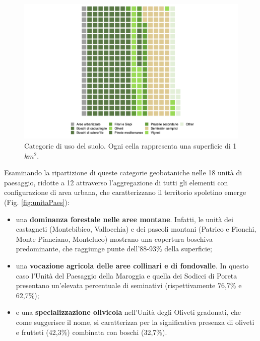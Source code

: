 \documentclass[
]{book}
\begin{document}
\begin{figure}
\includegraphics[width=22.22in]{./figs/RECSpoleto_usoSuoloPlot} \caption{Categorie di uso del suolo. Ogni cella rappresenta una superficie di 1 $km^2$.}\label{fig:usoSuolo}
\end{figure}

Esaminando la ripartizione di queste categorie geobotaniche nelle 18 unità di paesaggio, ridotte a 12 attraverso l'aggregazione di tutti gli elementi con configurazione di area urbana, che caratterizzano il territorio spoletino emerge (Fig. \ref{fig:unitaPaes}):

\begin{itemize}
\item
  una \textbf{dominanza forestale nelle aree montane}.
  Infatti, le unità dei castagneti (Montebibico, Vallocchia) e dei pascoli montani (Patrico e Fionchi, Monte Pianciano, Monteluco) mostrano una copertura boschiva predominante, che raggiunge punte dell'88-93\% della superficie;
\item
  una \textbf{vocazione agricola delle aree collinari e di fondovalle}.
  In questo caso l'Unità del Paesaggio della Maroggia e quella dei Sodicci di Poreta presentano un'elevata percentuale di seminativi (rispettivamente 76,7\% e 62,7\%);
\item
  e una \textbf{specializzazione olivicola} nell'Unità degli Oliveti gradonati, che come suggerisce il nome, si caratterizza per la significativa presenza di oliveti e frutteti (42,3\%) combinata con boschi (32,7\%).
\end{itemize}
\end{document}
